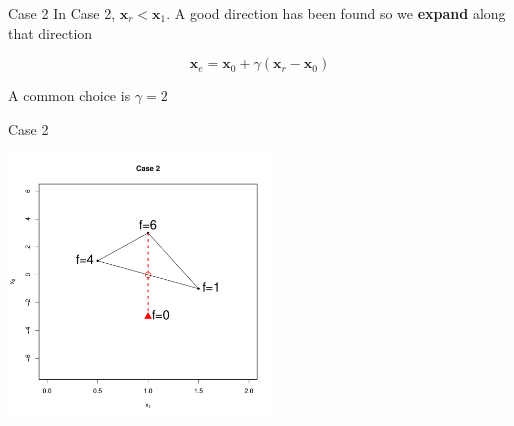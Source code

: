\documentclass[10pt]{beamer}
\begin{document}
                                                                                              \begin{frame}{Case 2}
                                                                                                In Case 2, ${\bm x_r}<{\bm x_1}$. A good direction has been found so we {\bf expand} along that direction

                                                                                                \begin{equation}
                                                                                                  {\bm x_e}={\bm x_0}+\gamma({\bm x_r}-{\bm x_0})
                                                                                                \end{equation}

                                                                                                A common choice is $\gamma=2$
                                                                                              \end{frame}
                                                                                              \begin{frame}{Case 2}
                                                                                                \begin{center}
                                                                                                  \includegraphics[height=7cm]{RCode/nmexpansion1.pdf}
                                                                                                \end{center}
                                                                                              \end{frame}
\end{document}
